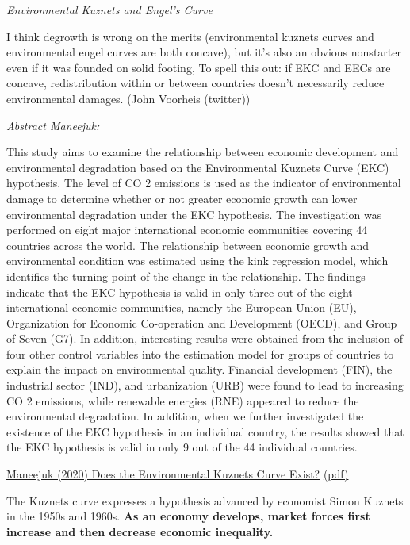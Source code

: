 \documentclass[
]{book}
\begin{document}
\emph{Environmental Kuznets and Engel's Curve}

I think degrowth is wrong on the merits (environmental kuznets curves and environmental engel curves
are both concave),
but it's also an obvious nonstarter even if it was founded on solid footing,
To spell this out: if EKC and EECs are concave,
redistribution within or between countries doesn't necessarily reduce environmental damages.
(John Voorheis (twitter))

\emph{Abstract Maneejuk:}

This study aims to examine the relationship between economic development and
environmental degradation based on the Environmental Kuznets Curve (EKC) hypothesis. The level
of CO 2 emissions is used as the indicator of environmental damage to determine whether or not greater
economic growth can lower environmental degradation under the EKC hypothesis. The investigation
was performed on eight major international economic communities covering 44 countries across
the world. The relationship between economic growth and environmental condition was estimated
using the kink regression model, which identifies the turning point of the change in the relationship.
The findings indicate that the EKC hypothesis is valid in only three out of the eight international
economic communities, namely the European Union (EU), Organization for Economic Co-operation
and Development (OECD), and Group of Seven (G7). In addition, interesting results were obtained
from the inclusion of four other control variables into the estimation model for groups of countries
to explain the impact on environmental quality. Financial development (FIN), the industrial sector
(IND), and urbanization (URB) were found to lead to increasing CO 2 emissions, while renewable
energies (RNE) appeared to reduce the environmental degradation. In addition, when we further
investigated the existence of the EKC hypothesis in an individual country, the results showed that the
EKC hypothesis is valid in only 9 out of the 44 individual countries.

\href{https://www.google.com/url?sa=t\&rct=j\&q=\&esrc=s\&source=web\&cd=\&cad=rja\&uact=8\&ved=2ahUKEwibz9unoJHvAhVPXRoKHeUDC5sQFjAIegQIBxAD\&url=https\%3A\%2F\%2Fwww.mdpi.com\%2F2071-1050\%2F12\%2F21\%2F9117\%2Fpdf\&usg=AOvVaw35OuEm4BhDFbPAb_esW2hF}{Maneejuk (2020) Does the Environmental Kuznets Curve Exist?}
\href{pdf/Maneejuk_2020_Does_EKC_exist.pdf}{(pdf)}

The Kuznets curve expresses a hypothesis advanced by economist Simon Kuznets in the 1950s and 1960s.
\textbf{As an economy develops, market forces first increase and then decrease economic inequality.}
\end{document}
